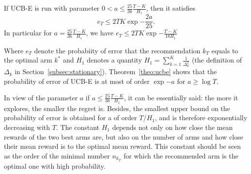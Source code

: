 \begin{theo}
\label{theo:ucbe}
If UCB-E is run with parameter $0 < a \leqslant \frac{25}{36} \frac{T-K}{H_1}$, then it satisfies
\begin{equation}
e_T \leqslant 2TK\exp{-\frac{2a}{25}}.
\end{equation}
In particular for $a=\frac{25}{36}\frac{T-K}{H_1}$, we have $e_T \leqslant 2TK\exp{-\frac{T-K}{18H_1}}$
\end{theo}

Where $e_T$ denote the probabiity of error that the recommendation $ k_T$ equals to the optimal arm $k^{\ast}$ and $H_1$ denotes a quantity $H_1 = \sum_{k=1}^{K}\frac{1}{\Delta_k^2}$ (the definition of $\Delta_k$ in Section~\ref{subsec:stationary}). Theorem~\ref{theo:ucbe} shows that the probability of error of UCB-E is at most of order $\exp{-a}$ for $a\geqslant \log{T}$. 

In view of the parameter $a$ if $a \leqslant \frac{25}{36}\frac{T-K}{H_1}$, it can be essentially said: the more it explores, the smaller the regret is. Besides, the smallest upper
bound on the probability of error is obtained for a of order $T/H_1$, and is therefore exponentially decreasing
with $T$. The constant $H_1$ depends not only on how close the mean rewards of the two best arms are, but
also on the number of arms and how close their mean reward is to the optimal mean reward. This constant
should be seen as the order of the minimal number $n_{k_T}$ for which the recommended arm is the optimal one with
high probability. 

